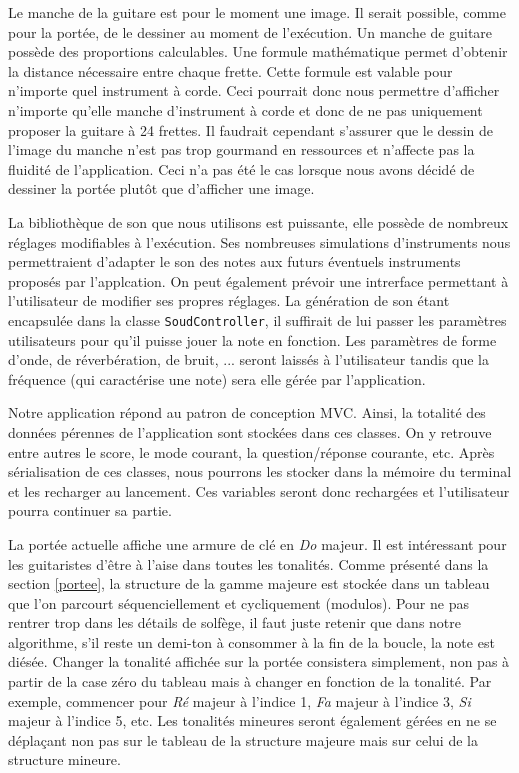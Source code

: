 \documentclass{scrreprt}
\begin{document}
Le manche de la guitare est pour le moment une image.
Il serait possible, comme pour la portée, de le dessiner au moment de l'exécution.
Un manche de guitare possède des proportions calculables.
Une formule mathématique permet d'obtenir la distance nécessaire entre chaque frette.
Cette formule est valable pour n'importe quel instrument à corde.
Ceci pourrait donc nous permettre d'afficher n'importe qu'elle manche d'instrument à corde et donc de ne pas uniquement proposer la guitare à 24 frettes.
Il faudrait cependant s'assurer que le dessin de l'image du manche n'est pas trop gourmand en ressources et n'affecte pas la fluidité de l'application.
Ceci n'a pas été le cas lorsque nous avons décidé de dessiner la portée plutôt que d'afficher une image.
\newline

La bibliothèque de son que nous utilisons est puissante, elle possède de nombreux réglages modifiables à l'exécution.
Ses nombreuses simulations d'instruments nous permettraient d'adapter le son des notes aux futurs éventuels instruments proposés par l'applcation.
On peut également prévoir une intrerface permettant à l'utilisateur de modifier ses propres réglages.
La génération de son étant encapsulée dans la classe \texttt{SoudController}, il suffirait de lui passer les paramètres utilisateurs pour qu'il puisse jouer la note en fonction.
Les paramètres de forme d'onde, de réverbération, de bruit, ... seront laissés à l'utilisateur tandis que la fréquence (qui caractérise une note) sera elle gérée par l'application. 
\newline

Notre application répond au patron de conception MVC.
Ainsi, la totalité des données pérennes de l'application sont stockées dans ces classes.
On y retrouve entre autres le score, le mode courant, la question/réponse courante, etc.
Après sérialisation de ces classes, nous pourrons les stocker dans la mémoire du terminal et les recharger au lancement.
Ces variables seront donc rechargées et l'utilisateur pourra continuer sa partie.
\newline

La portée actuelle affiche une armure de clé en \textit{Do} majeur.
Il est intéressant pour les guitaristes d'être à l'aise dans toutes les tonalités.
Comme présenté dans la section \ref{portee}, la structure de la gamme majeure est stockée dans un tableau que l'on parcourt séquenciellement et cycliquement (modulos).
Pour ne pas rentrer trop dans les détails de solfège, il faut juste retenir que dans notre algorithme, s'il reste un demi-ton à consommer à la fin de la boucle, la note est diésée.
Changer la tonalité affichée sur la portée consistera simplement, non pas à partir de la case zéro du tableau mais à changer en fonction de la tonalité.
Par exemple, commencer pour \textit{Ré} majeur à l'indice 1, \textit{Fa} majeur à l'indice 3, \textit{Si} majeur à l'indice 5, etc.
Les tonalités mineures seront également gérées en ne se déplaçant non pas sur le tableau de la structure majeure mais sur celui de la structure mineure.
\end{document}
